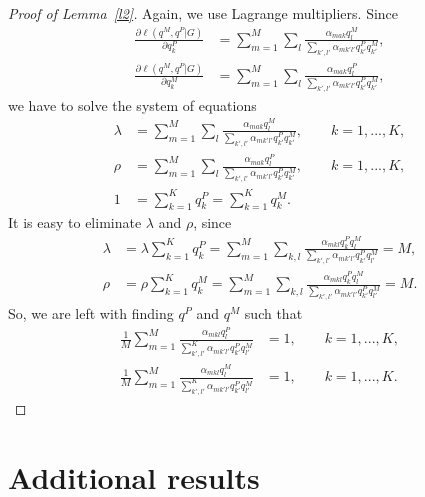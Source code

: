 \documentclass[12pt]{article}
\theoremstyle{definition}
\begin{document}
\begin{proof}[Proof of Lemma~\ref{l2}]
  Again, we use Lagrange multipliers. Since
  \begin{align*}
    \frac{\partial \ell(q^M, q^P|G)}{\partial q^P_k}
    & = \sum_{m=1}^M \sum_l \frac{\alpha_{mak}q_l^M}{\sum_{k',l'} \alpha_{mk'l'}q^P_{k'}q^M_{k'}},
    \\
    \frac{\partial \ell(q^M, q^P|G)}{\partial q^M_k}
    & = \sum_{m=1}^M \sum_l \frac{\alpha_{mak}q_l^P}{\sum_{k',l'} \alpha_{mk'l'}q^P_{k'}q^M_{k'}},
  \end{align*}
  we have to solve the system of equations
  \begin{align*}
    \lambda & = \sum_{m=1}^M \sum_l \frac{\alpha_{mak}q_l^M}{\sum_{k',l'} \alpha_{mk'l'}q^P_{k'}q^M_{k'}}, \qquad k=1,...,K,\\
    \rho & = \sum_{m=1}^M \sum_l \frac{\alpha_{mak}q_l^P}{\sum_{k',l'} \alpha_{mk'l'}q^P_{k'}q^M_{k'}}, \qquad k=1,...,K,
    \\
    1 & = \sum_{k=1}^K q^P_k = \sum_{k=1}^K q^M_k.
  \end{align*}
  It is easy to eliminate $\lambda$ and $\rho$, since
  \begin{align*}
    \lambda & = \lambda \sum_{k=1}^K q^P_k = \sum_{m=1}^M \sum_{k,l}
              \frac{\alpha_{mkl}q^P_kq_l^M}{\sum_{k',l'} \alpha_{mk'l'}q^P_{k'}q_{l'}^M} = M,
    \\
    \rho & = \rho \sum_{k=1}^K q_k^M = \sum_{m=1}^M \sum_{k,l}
           \frac{\alpha_{mkl}q^P_kq_l^M}{\sum_{k',l'} \alpha_{mk'l'}q^P_{k'}q_{l'}^M} = M.    
  \end{align*}
  So, we are left with finding $q^P$ and $q^M$ such that
  \begin{align*}
    \frac{1}{M}\sum_{m=1}^M \frac{\alpha_{mkl}q_l^P}{\sum_{k',l'}^K \alpha_{mk'l'}q^P_{k'} q^M_{l'}} & = 1, \qquad k=1,...,K,
    \\ \frac{1}{M}\sum_{m=1}^M \frac{\alpha_{mkl}q_l^M}{\sum_{k',l'}^K \alpha_{mk'l'}q^P_{k'} q^M_{l'}} & = 1, \qquad k=1,...,K.
  \end{align*}
\end{proof}

\newpage

\section{Additional results}
\end{document}
